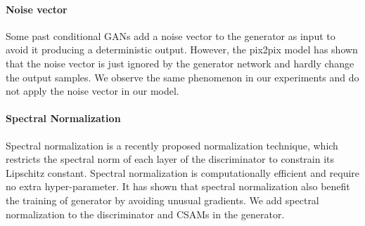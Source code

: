 \paragraph{Noise vector} Some past conditional GANs add a noise vector to the generator as input to avoid it producing a deterministic output. However, the pix2pix model has shown that the noise vector is just ignored by the generator network and hardly change the output samples. We observe the same phenomenon in our experiments and do not apply the noise vector in our model. 
\paragraph{Spectral Normalization} Spectral normalization \cite{SN} is a recently proposed normalization technique, which restricts the spectral norm of each layer of the discriminator to constrain its Lipschitz constant. Spectral normalization is computationally efficient and require no extra hyper-parameter. It has shown that spectral normalization also benefit the training of generator by avoiding unusual gradients. We add spectral normalization to the discriminator and CSAMs in the generator.
%